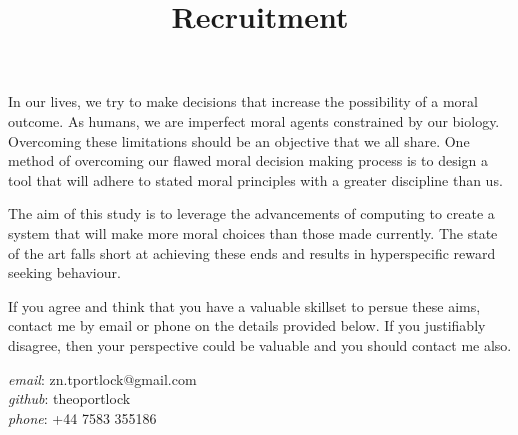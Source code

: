 \documentclass[12pt]{article}
\title{Recruitment}
\date{\vspace{-5ex}}
\begin{document}
\maketitle

In our lives, we try to make decisions that increase the possibility of a moral outcome.
As humans, we are imperfect moral agents constrained by our biology.
Overcoming these limitations should be an objective that we all share.
One method of overcoming our flawed moral decision making process is to design a tool that will adhere to stated moral principles with a greater discipline than us.

\vspace{5mm}
\noindent
The aim of this study is to leverage the advancements of computing to create a system that will make more moral choices than those made currently.
The state of the art falls short at achieving these ends and results in hyperspecific reward seeking behaviour.

\vspace{5mm}
\noindent
If you agree and think that you have a valuable skillset to persue these aims, contact me by email or phone on the details provided below.
If you justifiably disagree, then your perspective could be valuable and you should contact me also.

\vspace{5mm}
\noindent
\emph{email}:	zn.tportlock@gmail.com \\
\emph{github}:	theoportlock \\
\emph{phone}:	+44 7583 355186
\end{document}
